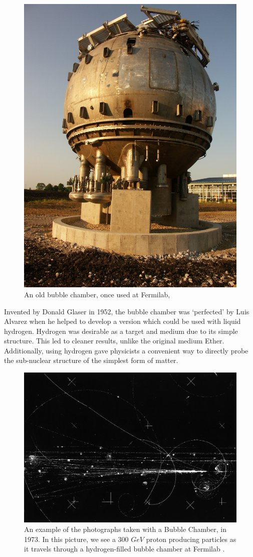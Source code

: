 \begin{figure}[ht]
	\centering
	\includegraphics[width=0.5\linewidth]{./figures/bubblechamberfnal.jpg}
	\caption{An old bubble chamber, once used at Fermilab,
	 \cite{FNALBubbleChamber2005}}
	\label{fig:bubble_chamber}
\end{figure}

Invented by Donald Glaser in 1952, the bubble chamber was `perfected' by Luis
Alvarez when he helped to develop a version which could be used with liquid
hydrogen. Hydrogen was desirable as a target and medium due to its simple
structure. This led to cleaner results, unlike the original medium Ether.
Additionally, using hydrogen gave physicists a convenient way to directly probe
the sub-nuclear structure of the simplest form of matter.

\begin{figure}[ht]
	\centering
	\includegraphics[width=0.5\linewidth]{./figures/bubble_chamber_tracks.jpg}
	\caption{
		An example of the photographs taken with a Bubble Chamber, in 1973.
		In this picture, we see a 300 $GeV$ proton producing particles as it travels
		through a hydrogen-filled bubble chamber at Fermilab  \cite{HD6B235}.
	}
	\label{fig:bubble_tracks}
\end{figure}

